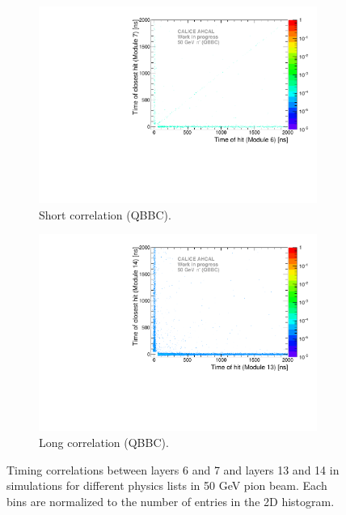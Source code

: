 \begin{figure}[htbp!]
\begin{subfigure}[t]{0.5\textwidth}
    \centering
    \includegraphics[width=1\textwidth]{../Thesis_Plots/Timing/Pions/Plots/ComparisonToSim/Time_Correlation_50GeV_short_QBBC.pdf}
    \caption{Short correlation (QBBC).} \label{fig:Corr_short_QBBC}
  \end{subfigure}
  \hfill
  \begin{subfigure}[t]{0.5\textwidth}
    \centering
    \includegraphics[width=1\textwidth]{../Thesis_Plots/Timing/Pions/Plots/ComparisonToSim/Time_Correlation_50GeV_long_QBBC.pdf}
    \caption{Long correlation (QBBC).} \label{fig:Corr_long_QBBC}
  \end{subfigure}
  \caption{Timing correlations between layers 6 and 7 and layers 13 and 14 in \mokka simulations for different physics lists in 50 GeV pion beam. Each bins are normalized to the number of entries in the 2D histogram.}
\end{figure}
